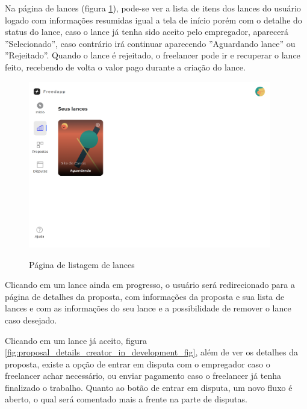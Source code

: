 Na página de lances (figura \ref{fig:bid_page_my_bids_fig}), pode-se ver a lista de itens dos lances do usuário logado com informações resumidas igual a tela de início porém com o detalhe do status do lance, caso o lance já tenha sido aceito pelo empregador, aparecerá ''Selecionado'', caso contrário irá continuar aparecendo ''Aguardando lance'' ou ''Rejeitado''. Quando o lance é rejeitado, o freelancer pode ir e recuperar o lance feito, recebendo de volta o valor pago durante a criação do lance.

\begin{figure}[!h]
  \centering
  \caption{Página de listagem de lances}
  \includegraphics[width=400px]{src/images/app/bid_page_my_bids.png}
  \label{fig:bid_page_my_bids_fig}
\end{figure}

Clicando em um lance ainda em progresso, o usuário será redirecionado para a página de detalhes da proposta, com informações da proposta e sua lista de lances e com as informações do seu lance e a possibilidade de remover o lance caso desejado.

Clicando em um lance já aceito, figura \ref{fig:proposal_details_creator_in_development_fig}, além de ver os detalhes da proposta, existe a opção de entrar em disputa com o empregador caso o freelancer achar necessário, ou enviar pagamento caso o freelancer já tenha finalizado o trabalho. Quanto ao botão de entrar em disputa, um novo fluxo é aberto, o qual será comentado mais a frente na parte de disputas.

